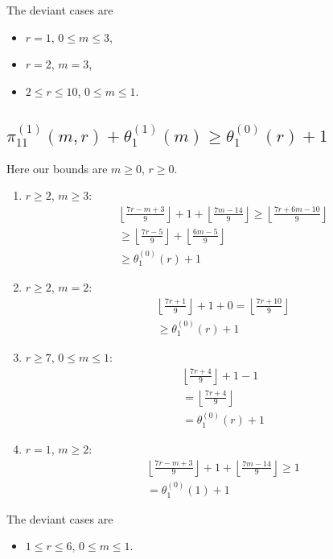 \documentclass[reqno]{amsart}
\theoremstyle{definition}
\theoremstyle{remark}
\numberwithin{equation}{section}
\begin{document}
The deviant cases are
\begin{itemize}
\item $r=1$, $0\le m\le 3$,
\item $r=2$, $m=3$,
\item $2\le r\le 10$, $0\le m\le 1$.
\end{itemize}

\subsection{$\displaystyle{\pi^{(1)}_{11}(m,r)+\theta^{(1)}_1(m)\ge \theta^{(0)}_1(r)+1}$}

Here our bounds are $m\ge 0$, $r\ge 0$.\\

\begin{enumerate}
\item $r\ge 2$, $m\ge 3$:
\begin{align*}
&\left\lfloor \frac{7r-m+3}{9} \right\rfloor + 1 + \left\lfloor \frac{7m-14}{9} \right\rfloor\ge\left\lfloor \frac{7r+6m-10}{9} \right\rfloor\\
&\ge\left\lfloor \frac{7r-5}{9} \right\rfloor + \left\lfloor \frac{6m-5}{9} \right\rfloor\\
&\ge\theta^{(0)}_1(r)+1
\end{align*}
\item $r\ge 2$, $m=2$:
\begin{align*}
&\left\lfloor \frac{7r+1}{9} \right\rfloor + 1 + 0 = \left\lfloor \frac{7r+10}{9} \right\rfloor\\
&\ge\theta^{(0)}_1(r)+1
\end{align*}
\item $r\ge 7$, $0\le m\le 1$:
\begin{align*}
&\left\lfloor \frac{7r+4}{9} \right\rfloor + 1 - 1\\
&= \left\lfloor \frac{7r+4}{9} \right\rfloor\\
&= \theta^{(0)}_1(r)+1
\end{align*}
\item $r=1$, $m\ge 2$:
\begin{align*}
&\left\lfloor \frac{7r-m+3}{9} \right\rfloor + 1 +\left\lfloor \frac{7m-14}{9} \right\rfloor\ge 1\\
&= \theta^{(0)}_1(1)+1
\end{align*}
\end{enumerate}

The deviant cases are
\begin{itemize}
\item $1\le r\le 6$, $0\le m\le 1$.
\end{itemize}
\end{document}
